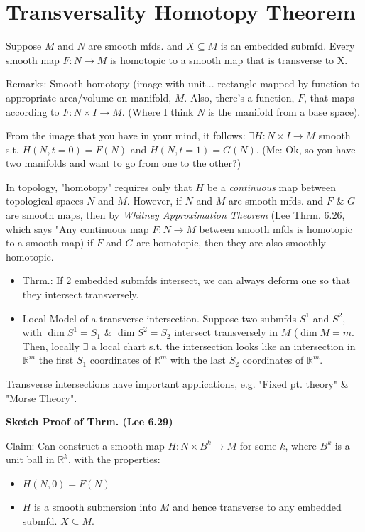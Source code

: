 \documentclass[12pt,letterpaper]{article}
\begin{document}
\section*{Transversality Homotopy Theorem}

Suppose $M$ and $N$ are smooth mfds. and $X \subseteq M$ is an embedded submfd. Every smooth map $F: N \rightarrow M$ is homotopic to a smooth map that is transverse to X. 

Remarks: Smooth homotopy (image with unit... rectangle mapped by function to appropriate area/volume on manifold, $M$.  Also, there's a function, $F$, that maps according to $F: N \times I \rightarrow M$. (Where I think $N$ is the manifold from a base space).

From the image that you have in your mind, it follows: $\exists H: N \times I \rightarrow M$ smooth s.t. $H(N, t=0) = F(N)$ and $H(N, t=1) = G(N)$. (Me: Ok, so you have two manifolds and want to go from one to the other?)

In topology, "homotopy" requires only that $H$ be a \textit{continuous} map between topological spaces $N$ and $M$. However, if $N$ and $M$ are smooth mfds. and $F$ & $G$ are smooth maps, then by \textit{Whitney Approximation Theorem} (Lee Thrm. 6.26, which says "Any continuous map $F: N \rightarrow M$ between smooth mfds is homotopic to a smooth map) if $F$ and $G$ are homotopic, then they are also smoothly homotopic. 

\begin{itemize}
    \item Thrm.: If 2 embedded submfds intersect, we can always deform one so that they intersect transversely.
    \item Local Model of a transverse intersection. Suppose two submfds $S^1$ and $S^2$, with $\dim S^1=S_1$ & $\dim S^2 = S_2$ intersect transversely in $M$ ($\dim M = m$. Then, locally $\exists $ a local chart s.t. the intersection looks like an intersection in $\mathbb{R}^m$ the first $S_1$ coordinates of $\mathbb{R}^m$ with the last $S_2$ coordinates of $\mathbb{R}^m$. 
\end{itemize}

Transverse intersections have important applications, e.g. "Fixed pt. theory" & "Morse Theory". 

\textbf{Sketch Proof of Thrm. (Lee 6.29)}

Claim: Can construct a smooth map $H: N \times B^k \rightarrow M$ for some $k$, where $B^k$ is a unit ball in $\mathbb{R}^k$, with the properties:
\begin{itemize}
    \item $H(N, 0) = F(N)$
    \item $H$ is a smooth submersion into $M$ and hence transverse to any embedded submfd. $X \subseteq M$. 
\end{itemize}
\end{document}
